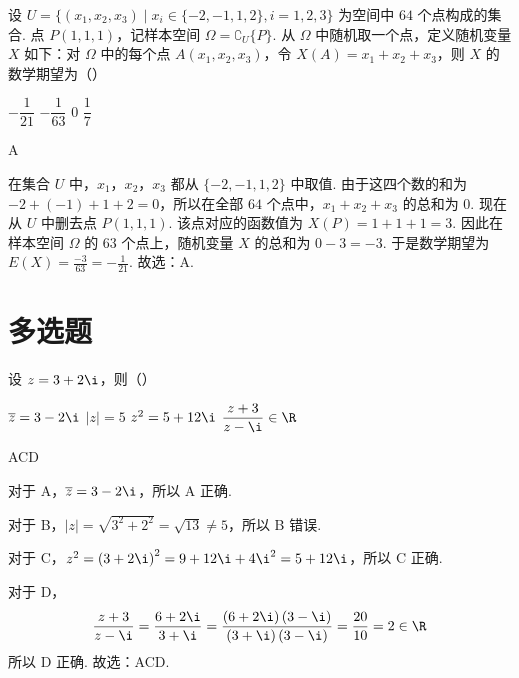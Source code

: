 \documentclass[UTF8,a4paper,oneside,11pt]{ctexbook}
\begin{document}
\begin{problem}
设 \(U=\{(x_1,x_2,x_3)\mid x_i\in\{-2,-1,1,2\},i=1,2,3\}\) 为空间中 \(64\) 个点构成的集合. 点 \(P(1,1,1)\)，记样本空间 \(\Omega=\complement_U \{P\}\). 从 \(\Omega\) 中随机取一个点，定义随机变量 \(X\) 如下：对 \(\Omega\) 中的每个点 \(A(x_1,x_2,x_3)\)，令 \(X(A)=x_1+x_2+x_3\)，则 \(X\) 的数学期望为（\quad）

\choices
    {\(-\dfrac{1}{21}\)}
    {\(-\dfrac{1}{63}\)}
    {\(0\)}
    {\(\dfrac{1}{7}\)}
\end{problem}

\begin{answer}
A
\end{answer}

\begin{solution}
在集合 \(U\) 中，\(x_1\)，\(x_2\)，\(x_3\) 都从 \(\{-2,-1,1,2\}\) 中取值. 由于这四个数的和为 \(-2+(-1)+1+2=0\)，所以在全部 \(64\) 个点中，\(x_1+x_2+x_3\) 的总和为 \(0\).
现在从 \(U\) 中删去点 \(P(1,1,1)\). 该点对应的函数值为 \(X(P)=1+1+1=3\). 因此在样本空间 \(\Omega\) 的 \(63\) 个点上，随机变量 \(X\) 的总和为 \(0-3=-3\). 于是数学期望为 \(E(X)=\frac{-3}{63}=-\frac{1}{21}\). 故选：A.
\end{solution}
\section{多选题}

\begin{problem}
设 \(z=3+2\i\)，则（\quad）

\choices
    {\(\overline{z}=3-2\i\)}
    {\(\lvert z \rvert=5\)}
    {\(z^2=5+12\i\)}
    {\(\dfrac{z+3}{z-\i}\in\R\)}
\end{problem}

\begin{answer}
ACD
\end{answer}

\begin{solution}
对于 A，\(\overline{z}=3-2\i\)，所以 A 正确.

对于 B，\(\lvert z \rvert=\sqrt{3^2+2^2}=\sqrt{13}\ne 5\)，所以 B 错误.

对于 C，\(z^2=\left( 3+2\i \right)^2=9+12\i+4\i^2=5+12\i\)，所以 C 正确.

对于 D，
\[
\frac{z+3}{z-\i}=\frac{6+2\i}{3+\i}=\frac{\left( 6+2\i \right)\left( 3-\i \right)}{\left( 3+\i \right)\left( 3-\i \right)}=\frac{20}{10}=2\in\R
\]
所以 D 正确.
故选：ACD.
\end{solution}
\end{document}
